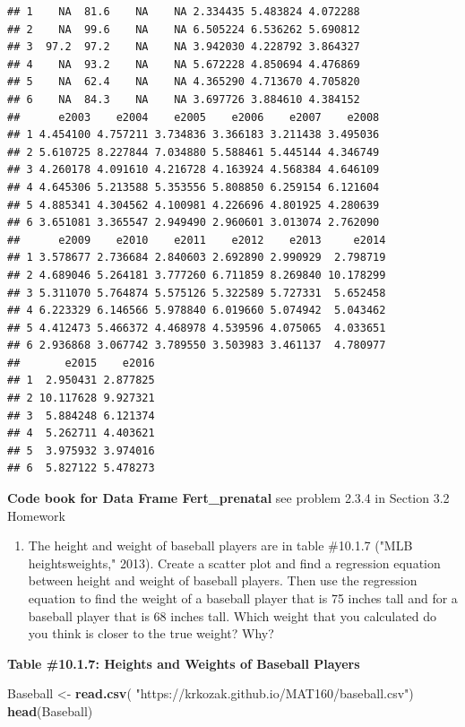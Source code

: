 \documentclass[
]{book}
\newenvironment{Shaded}{\begin{snugshade}}{\end{snugshade}}
\newcommand{\KeywordTok}[1]{\textcolor[rgb]{0.13,0.29,0.53}{\textbf{#1}}}
\newcommand{\NormalTok}[1]{#1}
\newcommand{\StringTok}[1]{\textcolor[rgb]{0.31,0.60,0.02}{#1}}
\providecommand{\tightlist}{%
  \setlength{\itemsep}{0pt}\setlength{\parskip}{0pt}}
\begin{document}
\begin{verbatim}
## 1    NA  81.6    NA    NA 2.334435 5.483824 4.072288
## 2    NA  99.6    NA    NA 6.505224 6.536262 5.690812
## 3  97.2  97.2    NA    NA 3.942030 4.228792 3.864327
## 4    NA  93.2    NA    NA 5.672228 4.850694 4.476869
## 5    NA  62.4    NA    NA 4.365290 4.713670 4.705820
## 6    NA  84.3    NA    NA 3.697726 3.884610 4.384152
##      e2003    e2004    e2005    e2006    e2007    e2008
## 1 4.454100 4.757211 3.734836 3.366183 3.211438 3.495036
## 2 5.610725 8.227844 7.034880 5.588461 5.445144 4.346749
## 3 4.260178 4.091610 4.216728 4.163924 4.568384 4.646109
## 4 4.645306 5.213588 5.353556 5.808850 6.259154 6.121604
## 5 4.885341 4.304562 4.100981 4.226696 4.801925 4.280639
## 6 3.651081 3.365547 2.949490 2.960601 3.013074 2.762090
##      e2009    e2010    e2011    e2012    e2013     e2014
## 1 3.578677 2.736684 2.840603 2.692890 2.990929  2.798719
## 2 4.689046 5.264181 3.777260 6.711859 8.269840 10.178299
## 3 5.311070 5.764874 5.575126 5.322589 5.727331  5.652458
## 4 6.223329 6.146566 5.978840 6.019660 5.074942  5.043462
## 5 4.412473 5.466372 4.468978 4.539596 4.075065  4.033651
## 6 2.936868 3.067742 3.789550 3.503983 3.461137  4.780977
##       e2015    e2016
## 1  2.950431 2.877825
## 2 10.117628 9.927321
## 3  5.884248 6.121374
## 4  5.262711 4.403621
## 5  3.975932 3.974016
## 6  5.827122 5.478273
\end{verbatim}

\textbf{Code book for Data Frame Fert\_prenatal} see problem 2.3.4 in Section 3.2 Homework

\begin{enumerate}
\def\labelenumi{\arabic{enumi}.}
\setcounter{enumi}{4}
\tightlist
\item
  The height and weight of baseball players are in table \#10.1.7 ("MLB heightsweights," 2013). Create a scatter plot and find a regression equation between height and weight of baseball players. Then use the regression equation to find the weight of a baseball player that is 75 inches tall and for a baseball player that is 68 inches tall. Which weight that you calculated do you think is closer to the true weight? Why?
\end{enumerate}

\textbf{Table \#10.1.7: Heights and Weights of Baseball Players}

\begin{Shaded}
\begin{Highlighting}[]
\NormalTok{Baseball <-}\StringTok{ }\KeywordTok{read.csv}\NormalTok{(}
  \StringTok{"https://krkozak.github.io/MAT160/baseball.csv"}\NormalTok{)}
\KeywordTok{head}\NormalTok{(Baseball)}
\end{Highlighting}
\end{Shaded}
\end{document}
